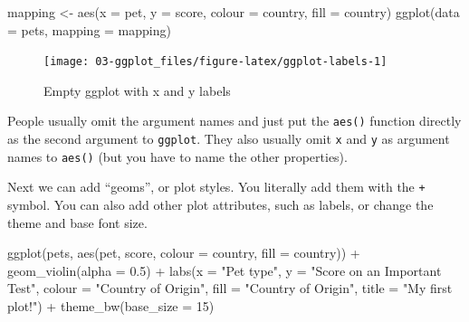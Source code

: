\documentclass[
  oneside]{book}
\newenvironment{Shaded}{\begin{snugshade}}{\end{snugshade}}
\newcommand{\AttributeTok}[1]{\textcolor[rgb]{0.77,0.63,0.00}{#1}}
\newcommand{\DecValTok}[1]{\textcolor[rgb]{0.00,0.00,0.81}{#1}}
\newcommand{\FloatTok}[1]{\textcolor[rgb]{0.00,0.00,0.81}{#1}}
\newcommand{\FunctionTok}[1]{\textcolor[rgb]{0.00,0.00,0.00}{#1}}
\newcommand{\NormalTok}[1]{#1}
\newcommand{\OtherTok}[1]{\textcolor[rgb]{0.56,0.35,0.01}{#1}}
\newcommand{\SpecialCharTok}[1]{\textcolor[rgb]{0.00,0.00,0.00}{#1}}
\newcommand{\StringTok}[1]{\textcolor[rgb]{0.31,0.60,0.02}{#1}}
\begin{document}
\begin{Shaded}
\begin{Highlighting}[]
\NormalTok{mapping }\OtherTok{\textless{}{-}} \FunctionTok{aes}\NormalTok{(}\AttributeTok{x =}\NormalTok{ pet, }
               \AttributeTok{y =}\NormalTok{ score, }
               \AttributeTok{colour =}\NormalTok{ country, }
               \AttributeTok{fill =}\NormalTok{ country)}
\FunctionTok{ggplot}\NormalTok{(}\AttributeTok{data =}\NormalTok{ pets, }\AttributeTok{mapping =}\NormalTok{ mapping)}
\end{Highlighting}
\end{Shaded}

\begin{figure}

{\centering \texttt{[image: 03-ggplot\_files/figure-latex/ggplot-labels-1]} 

}

\caption{Empty ggplot with x and y labels}\label{fig:ggplot-labels}
\end{figure}

\begin{info}
People usually omit the argument names and just put the \texttt{aes()} function directly as the second argument to \texttt{ggplot}. They also usually omit \texttt{x} and \texttt{y} as argument names to \texttt{aes()} (but you have to name the other properties).

\end{info}

Next we can add ``geoms'', or plot styles. You literally add them with the \texttt{+} symbol. You can also add other plot attributes, such as labels, or change the theme and base font size.

\begin{Shaded}
\begin{Highlighting}[]
\FunctionTok{ggplot}\NormalTok{(pets, }\FunctionTok{aes}\NormalTok{(pet, score, }\AttributeTok{colour =}\NormalTok{ country, }\AttributeTok{fill =}\NormalTok{ country)) }\SpecialCharTok{+}
  \FunctionTok{geom\_violin}\NormalTok{(}\AttributeTok{alpha =} \FloatTok{0.5}\NormalTok{) }\SpecialCharTok{+}
  \FunctionTok{labs}\NormalTok{(}\AttributeTok{x =} \StringTok{"Pet type"}\NormalTok{,}
       \AttributeTok{y =} \StringTok{"Score on an Important Test"}\NormalTok{,}
       \AttributeTok{colour =} \StringTok{"Country of Origin"}\NormalTok{,}
       \AttributeTok{fill =} \StringTok{"Country of Origin"}\NormalTok{,}
       \AttributeTok{title =} \StringTok{"My first plot!"}\NormalTok{) }\SpecialCharTok{+}
  \FunctionTok{theme\_bw}\NormalTok{(}\AttributeTok{base\_size =} \DecValTok{15}\NormalTok{)}
\end{Highlighting}
\end{Shaded}
\end{document}
